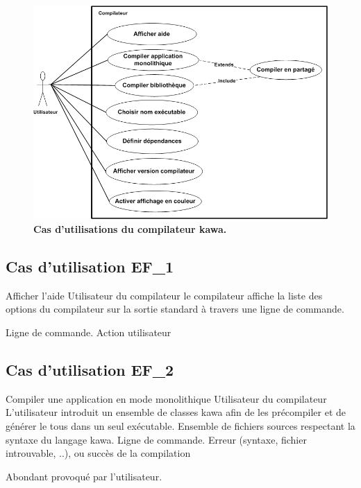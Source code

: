 \begin{figure}
  \centering
  \includegraphics[scale=0.8]{../res/stb/UseCase_07.jpg}
  \caption{\textbf{Cas d'utilisations du compilateur kawa.}}
\end{figure}

\subsection{Cas d'utilisation EF\_1}
\fiche
{Afficher l'aide}                    %
{Utilisateur du compilateur}                               %
{                                                %
  le compilateur affiche 
   la liste des options du compilateur sur la sortie standard à travers une ligne de commande.
}
{
  
}                                                %
{Ligne de commande.}                             %
{Action utilisateur}                       %
{} %
{} %
{} %

\subsection{Cas d'utilisation EF\_2}
\fiche
{Compiler une application en mode monolithique}                    %
{Utilisateur du compilateur}                               %
{                                                %
  L'utilisateur introduit un ensemble de classes
  kawa afin de les précompiler et de générer le tous dans un seul exécutable.
}
{
	Ensemble de fichiers sources 
	respectant la syntaxe du langage kawa. 
}                                                %
{Ligne de commande.}                             %
{Erreur (syntaxe, fichier introuvable, ..), ou 
 succès de la compilation}                       %
{                                                %
  
}
{} %
{ Abondant provoqué par l'utilisateur. } %


